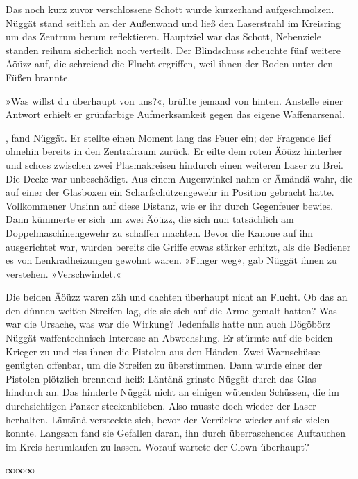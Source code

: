 Das noch kurz zuvor verschlossene Schott wurde kurzerhand aufgeschmolzen. Nüggät stand seitlich an der Außenwand und ließ den Laserstrahl im Kreisring um das Zentrum herum reflektieren. Hauptziel war das Schott, Nebenziele standen reihum sicherlich noch verteilt. Der Blindschuss scheuchte fünf weitere Äöüzz auf, die schreiend die Flucht ergriffen, weil ihnen der Boden unter den Füßen brannte.

»Was willst du überhaupt von uns?«, brüllte jemand von hinten. Anstelle einer Antwort erhielt er grünfarbige Aufmerksamkeit gegen das eigene Waffenarsenal.

, fand Nüggät. Er stellte einen Moment lang das Feuer ein; der Fragende lief ohnehin bereits in den Zentralraum zurück.  Er eilte dem roten Äöüzz hinterher und schoss zwischen zwei Plasmakreisen hindurch einen weiteren Laser zu Brei. Die Decke war unbeschädigt. Aus einem Augenwinkel nahm er Ämändä wahr, die auf einer der Glasboxen ein Scharfschützengewehr in Position gebracht hatte. Vollkommener Unsinn auf diese Distanz, wie er ihr durch Gegenfeuer bewies. Dann kümmerte er sich um zwei Äöüzz, die sich nun tatsächlich am Doppelmaschinengewehr zu schaffen machten. Bevor die Kanone auf ihn ausgerichtet war, wurden bereits die Griffe etwas stärker erhitzt, als die Bediener es von Lenkradheizungen gewohnt waren. »Finger weg«, gab Nüggät ihnen zu verstehen. »Verschwindet.«

Die beiden Äöüzz waren zäh und dachten überhaupt nicht an Flucht. Ob das an den dünnen weißen Streifen lag, die sie sich auf die Arme gemalt hatten? Was war die Ursache, was war die Wirkung? Jedenfalls hatte nun auch Dögöbörz Nüggät waffentechnisch Interesse an Abwechslung. Er stürmte auf die beiden Krieger zu und riss ihnen die Pistolen aus den Händen. Zwei Warnschüsse genügten offenbar, um die Streifen zu überstimmen. Dann wurde einer der Pistolen plötzlich brennend heiß: Läntänä grinste Nüggät durch das Glas hindurch an. Das hinderte Nüggät nicht an einigen wütenden Schüssen, die im durchsichtigen Panzer steckenblieben. Also musste doch wieder der Laser herhalten. Läntänä versteckte sich, bevor der Verrückte wieder auf sie zielen konnte. Langsam fand sie Gefallen daran, ihn durch überraschendes Auftauchen im Kreis herumlaufen zu lassen. Worauf wartete der Clown überhaupt?

\begin{center}
	∞∞∞
\end{center}


